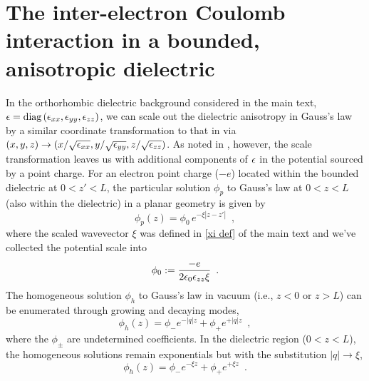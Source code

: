 \section{The inter-electron Coulomb interaction in a bounded, anisotropic dielectric}
\label{appendix: Coulomb}

In the orthorhombic dielectric background considered in the main text, $\epsilon=\text{diag}\,(\epsilon_{xx},\epsilon_{yy},\epsilon_{zz})$, we can scale out the dielectric anisotropy in Gauss's law by a similar coordinate transformation to that in  via $(x,y,z)\to(x/\sqrt{\epsilon_{xx}},y/\sqrt{\epsilon_{yy}},z/\sqrt{\epsilon_{zz}})$.  As noted in \cite{Mele2001,Ivchenko2021}, however, the scale transformation leaves us with additional components of $\epsilon$ in the potential sourced by a point charge.  For an electron point charge ($-e$) located within the bounded dielectric at $0<z'<L$, the particular solution $\phi_p$ to Gauss's law at $0<z<L$ (also within the dielectric) in a planar geometry is given by
\begin{equation}
    \label{app phip def}
    \phi_p(z) = \phi_0 \,e^{-\xi|z-z'|}
    \,\,\,,
\end{equation}
where the scaled wavevector $\xi$ was defined in \eqref{xi def} of the main text and we've collected the potential scale into
\begin{equation}
    \label{app phi0 def}
    \phi_0:= \frac{-e}{2\epsilon_0\epsilon_{zz}\xi}
    \,\,\,.
\end{equation}
The homogeneous solution $\phi_h$ to Gauss's law in vacuum (i.e., $z<0$ or $z>L$) can be enumerated through growing and decaying modes,
\begin{equation}
    \label{app phih vac def}
    \phi_h(z) = \phi_- e^{-|q| z} + \phi_+ e^{+|q| z}
    \,\,\,,
\end{equation}
where the $\phi_{\pm}$ are undetermined coefficients.  In the dielectric region ($0<z<L$), the homogeneous solutions remain exponentials but with the substitution $|q|\to\xi$,
\begin{equation}
    \label{app phih mat def}
    \phi_h(z) = \phi_- e^{-\xi z} + \phi_+ e^{+\xi z}
    \,\,\,.
\end{equation}

